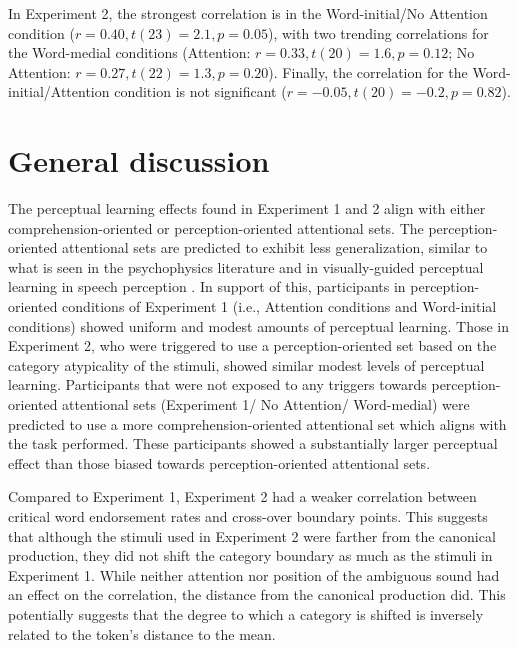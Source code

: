In Experiment 2, the strongest correlation is in the Word-initial/No Attention condition ($r = 0.40, t(23) = 2.1, p = 0.05$), with two trending correlations for the Word-medial conditions (Attention: $r = 0.33, t(20) = 1.6, p = 0.12$; No Attention: $r = 0.27, t(22) = 1.3, p = 0.20$).  Finally, the correlation for the Word-initial/Attention condition is not significant ($r = -0.05, t(20) = -0.2, p = 0.82$).

\section{General discussion}

The perceptual learning effects found in Experiment 1 and 2 align with either comprehension-oriented or perception-oriented attentional sets.  
The perception-oriented attentional sets are predicted to exhibit less generalization, similar to what is seen in the psychophysics literature and  in visually-guided perceptual learning in speech perception \citep{Reinisch2014}.
In support of this, participants in perception-oriented conditions of Experiment 1  (i.e., Attention conditions and Word-initial conditions) showed uniform and modest amounts of perceptual learning.
Those in Experiment 2, who were triggered to use a perception-oriented set based on the category atypicality of the stimuli, showed similar modest levels of perceptual learning.
Participants that were not exposed to any triggers towards perception-oriented attentional sets (Experiment 1/ No Attention/ Word-medial) were predicted to use a more comprehension-oriented attentional set which aligns with the task performed.
These participants showed a substantially larger perceptual effect than those biased towards perception-oriented attentional sets.

Compared to Experiment 1, Experiment 2 had a weaker correlation between critical word endorsement rates and cross-over boundary points.
This suggests that although the stimuli used in Experiment 2 were farther from the canonical production, they did not shift the category boundary as much as the stimuli in Experiment 1.  
While neither attention nor position of the ambiguous sound had an effect on the correlation, the distance from the canonical production did.  
This potentially suggests that the degree to which a category is shifted is inversely related to the token's distance to the mean.


